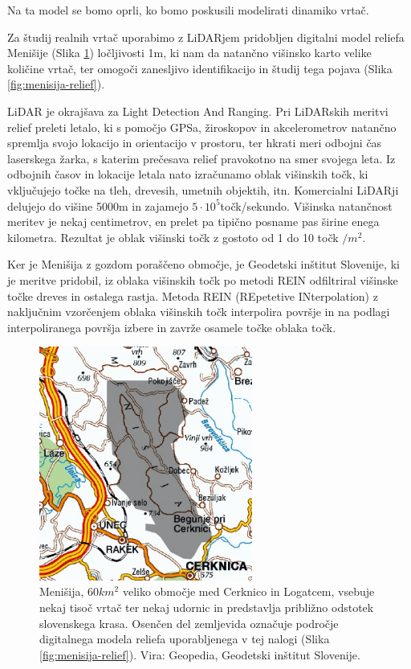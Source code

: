 \documentclass[a4paper, twoside, 12pt]{book}
\begin{document}
Na ta model se bomo oprli, ko bomo poskusili modelirati dinamiko vrtač.

  Za študij realnih vrtač uporabimo z LiDARjem pridobljen digitalni model reliefa Menišije (Slika \ref{fig:menisija-karta}) ločljivosti 1m, ki nam da natančno višinsko karto velike količine vrtač, ter omogoči zanesljivo identifikacijo in študij tega pojava (Slika \ref{fig:menisija-relief}).

  LiDAR je okrajšava za Light Detection And Ranging. Pri LiDARskih meritvi relief preleti letalo, ki s pomočjo GPSa, žiroskopov in akcelerometrov natančno spremlja svojo lokacijo in orientacijo v prostoru, ter hkrati meri odbojni čas laserskega žarka, s katerim prečesava relief pravokotno na smer svojega leta. Iz odbojnih časov in lokacije letala nato izračunamo oblak višinskih točk, ki vključujejo točke na tleh, drevesih, umetnih objektih, itn. Komercialni LiDARji delujejo do višine 5000m in zajamejo $5 \cdot 10^5$točk/sekundo. Višinska natančnost meritev je nekaj centimetrov, en prelet pa tipično posname pas širine enega kilometra. Rezultat je oblak višinski točk z gostoto od 1 do 10 točk $/ m^2$.

  Ker je Menišija z gozdom poraščeno območje, je Geodetski inštitut Slovenije, ki je meritve pridobil, iz oblaka višinskih točk po metodi REIN \cite{Kobler20079} odfiltriral višinske točke dreves in ostalega rastja. Metoda REIN (REpetetive INterpolation) z naključnim vzorčenjem oblaka višinskih točk interpolira površje in na podlagi interpoliranega površja izbere in zavrže osamele točke oblaka točk.

  \begin{figure}[h]
    \begin{center}
      \includegraphics[width=7cm]{slike/menisija-karta}
    \end{center}
    \caption{Menišija, $60 km^2$ veliko območje med Cerknico in Logatcem, vsebuje nekaj tisoč vrtač ter nekaj udornic in predstavlja približno odstotek slovenskega krasa. Osenčen del zemljevida označuje področje digitalnega modela reliefa uporabljenega v tej nalogi (Slika \ref{fig:menisija-relief}). Vira: Geopedia, Geodetski inštitut Slovenije.}
    \label{fig:menisija-karta}
  \end{figure}
\end{document}
